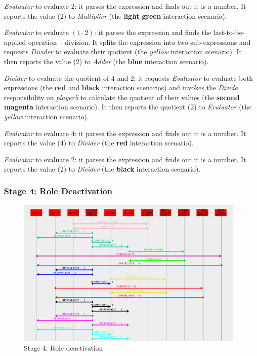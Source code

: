 \textit{Evaluator} to evaluate $2$: it parses the expression and finds out it is a number.
It reports the value (2) to \textit{Multiplier} (the \textbf{light green} interaction scenario).

\textit{Evaluator} to evaluate $(1\cdot2)$: it parses the expression and finds the last-to-be-applied operation -- division.
It splits the expression into two sub-expressions and requests \textit{Divider} to evaluate their quotient (the \textit{yellow} interaction scenario).
It then reports the value (2) to \textit{Adder} (the \textbf{blue} interaction scenario).

\textit{Divider} to evaluate the quotient of $4$ and $2$: it requests \textit{Evaluator} to evaluate both expressions (the \textbf{red} and \textbf{black} interaction scenarios) and invokes the \textit{Divide} responsibility on \textit{player5} to calculate the quotient of their values (the \textbf{second magenta} interaction scenario).
It then reports the quotient (2) to \textit{Evaluator} (the \textit{yellow} interaction scenario).

\textit{Evaluator} to evaluate $4$: it parses the expression and finds out it is a number.
It reports the value (4) to \textit{Divider} (the \textbf{red} interaction scenario).

\textit{Evaluator} to evaluate $2$: it parses the expression and finds out it is a number.
It reports the value (2) to \textit{Divider} (the \textbf{black} interaction scenario).

\subsubsection*{Stage 4: Role Deactivation}

\begin{figure}[H]
	\centering
	\includegraphics[width=\textwidth]{images/examples/example2-stage4.png}
	\caption{Stage 4: Role deactivation}
	\label{figure:example2-stage4}
\end{figure}

